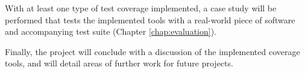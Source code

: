 With at least one type of test coverage implemented, a case study will be performed that tests the implemented tools with a real-world piece of software and accompanying test suite (Chapter \ref{chap:evaluation}). 

Finally, the project will conclude with a discussion of the implemented coverage tools, and will detail areas of further work for future projects.